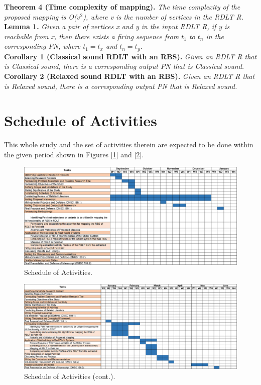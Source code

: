 \documentclass[12pt]{article}
\begin{document}
    \noindent \textbf{Theorem 4 (Time complexity of mapping).} \textit{The time complexity of the proposed mapping is O($v^2$), where v is the number of vertices in the RDLT R.} \\

    \textbf{Lemma 1.} \textit{Given a pair of vertices x and y in the input RDLT R, if y is reachable from x, then there exists a firing sequence from $t_{1}$ to $t_{n}$ in the corresponding PN, where $t_{1} = t_{x}$ and $t_{n} = t_{y}$.} \\

    \textbf{Corollary 1 (Classical sound RDLT with an RBS).} \textit{Given an RDLT R that is Classical sound, there is a corresponding output PN that is Classical sound.} \\

    \textbf{Corollary 2 (Relaxed sound RDLT with an RBS).} \textit{Given an RDLT R that is Relaxed sound, there is a corresponding output PN that is Relaxed sound.}

\section{Schedule of Activities}
This whole study and the set of activities therein are expected to be done within the given period shown in Figures [\ref{schedule}] and [\ref{schedule_cont}].

    \begin{figure}
        \centering
        \includegraphics[scale=0.55]{figures/Schedule of Activities_1_v2.png}
        \caption{Schedule of Activities.}
        \label{schedule}
    \end{figure}
    
    \begin{figure}
        \centering
        \includegraphics[scale=0.55]{figures/Schedule of Activities_2_v2.png}
        \caption{Schedule of Activities (cont.).}
        \label{schedule_cont}
    \end{figure}

\pagebreak

\printbibliography[heading=bibintoc, title={References}]
\end{document}
